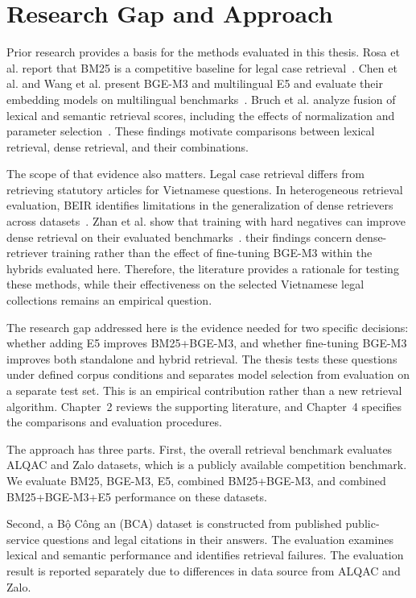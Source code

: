 \section{Research Gap and Approach}

Prior research provides a basis for the methods evaluated in this thesis. Rosa et al. report that BM25 is a competitive baseline for legal case retrieval~\cite{rosa2021}. Chen et al. and Wang et al. present BGE-M3 and multilingual E5 and evaluate their embedding models on multilingual benchmarks~\cite{chen2024,wang2024}. Bruch et al. analyze fusion of lexical and semantic retrieval scores, including the effects of normalization and parameter selection~\cite{bruch2022}. These findings motivate comparisons between lexical retrieval, dense retrieval, and their combinations.

The scope of that evidence also matters. Legal case retrieval differs from retrieving statutory articles for Vietnamese questions. In heterogeneous retrieval evaluation, BEIR identifies limitations in the generalization of dense retrievers across datasets~\cite{thakur2021}. Zhan et al. show that training with hard negatives can improve dense retrieval on their evaluated benchmarks~\cite{zhan2021}. their findings concern dense-retriever training rather than the effect of fine-tuning BGE-M3 within the hybrids evaluated here. Therefore, the literature provides a rationale for testing these methods, while their effectiveness on the selected Vietnamese legal collections remains an empirical question.

The research gap addressed here is the evidence needed for two specific decisions: whether adding E5 improves BM25+BGE-M3, and whether fine-tuning BGE-M3 improves both standalone and hybrid retrieval. The thesis tests these questions under defined corpus conditions and separates model selection from evaluation on a separate test set. This is an empirical contribution rather than a new retrieval algorithm. Chapter~2 reviews the supporting literature, and Chapter~4 specifies the comparisons and evaluation procedures.

The approach has three parts. First, the overall retrieval benchmark evaluates ALQAC and Zalo datasets, which is a publicly available competition benchmark. We evaluate BM25, BGE-M3, E5, combined BM25+BGE-M3, and combined BM25+BGE-M3+E5 performance on these datasets.

Second, a Bộ Công an (BCA) dataset is constructed from published public-service questions and legal citations in their answers. The evaluation examines lexical and semantic performance and identifies retrieval failures. The evaluation result is reported separately due to differences in data source from ALQAC and Zalo.

